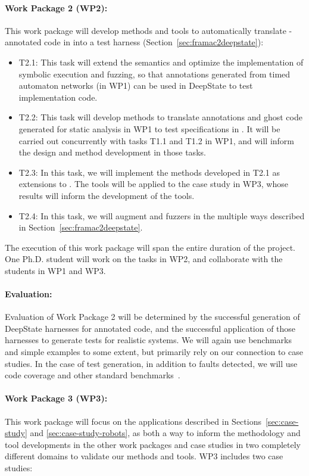 \paragraph{Work Package 2 (WP2):}  This work package will develop
methods and tools to automatically translate \acsl-annotated code in
\framac into a \deepstate test harness (Section~\ref{sec:framac2deepstate}):
\begin{itemize}[labelsep=3pt,leftmargin=12pt]
\item T2.1: This task will extend the \eacsl semantics and optimize the implementation of symbolic execution and fuzzing, so that \acsl annotations generated from timed automaton networks (in WP1) can be used in DeepState to test implementation code.
\item T2.2: This task will develop methods to translate annotations and ghost code generated for static analysis in WP1 to test specifications in \deepstate.  It will be carried out concurrently with tasks T1.1 and T1.2 in WP1, and will inform the design and method development in those tasks.
\item T2.3: In this task, we will implement the methods developed in
  T2.1 as extensions to \deepstate.  The tools will be applied to the
  case study in WP3, whose results will inform the development of the
  tools.
\item T2.4: In this task, we will augment \deepstate and fuzzers in the multiple ways described in Section~\ref{sec:framac2deepstate}.  
\end{itemize}

The execution of this work package will span the entire duration of the project.
One Ph.D. student will work on the tasks in WP2, and collaborate with
the students in WP1 and WP3.

\paragraph{Evaluation:} Evaluation of
Work Package 2 will be determined by the successful generation of
DeepState harnesses for \acsl annotated code, and the successful
application of those harnesses to generate tests for realistic
systems.  We will again use benchmarks and simple examples to some
extent, but primarily rely on our connection to case studies.
In the case of test generation, in addition to faults
detected, we will use code coverage and other standard benchmarks~\cite{FuzzerHicks}.


\paragraph{Work Package 3 (WP3):}  This work package will focus on the applications described in Sections~\ref{sec:case-study} and \ref{sec:case-study-robots}, as both a way to inform the methodology and tool developments in the other work packages and case studies in two completely different domains to validate our methods and tools.
WP3 includes two case studies:
